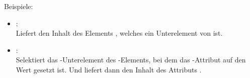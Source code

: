Beispiele:

\begin{itemize}

\item
{}:\\
Liefert den Inhalt des Elements , welches ein Unterelement von  ist.	

\item
{}:\\
Selektiert das -Unterelement des -Elements, bei
dem das -Attribut auf den Wert  gesetzt ist. Und liefert dann den Inhalt des Attributs
.

\end{itemize}
